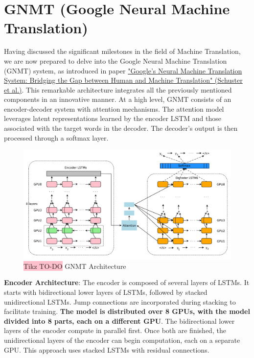 \section{GNMT (Google Neural Machine Translation)}

Having discussed the significant milestones in the field of Machine Translation, we are now prepared to delve into the Google Neural Machine Translation (GNMT) system, as introduced in paper \href{https://arxiv.org/pdf/1609.08144}{"Google's Neural Machine Translation System: Bridging the Gap between Human and Machine Translation" (Schuster et al.)}. This remarkable architecture integrates all the previously mentioned components in an innovative manner. At a high level, GNMT consists of an encoder-decoder system with attention mechanisms. The attention model leverages latent representations learned by the encoder LSTM and those associated with the target words in the decoder. The decoder's output is then processed through a softmax layer.

\begin{figure}[!htbp]
    \centering
    \includegraphics[width=1\linewidth]{tikz/chapter7 - GNMT.png}
    \caption{{\color{red}\colorbox{pink}{Tikz TO-DO}} GNMT Architecture}
\end{figure}

\textbf{Encoder Architecture}: The encoder is composed of several layers of LSTMs. It starts with bidirectional lower layers of LSTMs, followed by stacked unidirectional LSTMs. Jump connections are incorporated during stacking to facilitate training. \textbf{The model is distributed over 8 GPUs, with the model divided into 8 parts, each on a different GPU}. The bidirectional lower layers of the encoder compute in parallel first. Once both are finished, the unidirectional layers of the encoder can begin computation, each on a separate GPU. This approach uses stacked LSTMs with residual connections.

